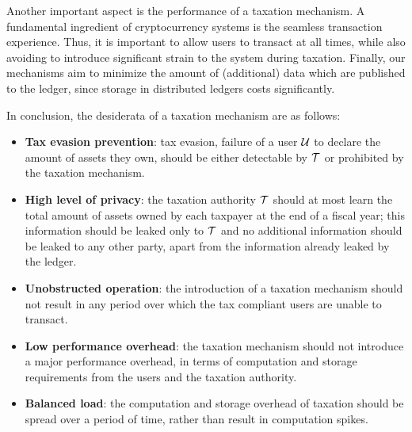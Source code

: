 Another important aspect is the performance of a taxation mechanism. A
fundamental ingredient of cryptocurrency systems is the seamless transaction
experience. Thus, it is important to allow users to transact at all times,
while also avoiding to introduce significant strain to the system during
taxation. Finally, our mechanisms aim to minimize the amount of (additional)
data which are published to the ledger, since storage in distributed ledgers
costs significantly.

In conclusion, the desiderata of a taxation mechanism are as follows:
\begin{itemize}
    \item \textbf{Tax evasion prevention}: tax evasion, \ie failure of a user
        $\mathcal{U}$ to declare the amount of assets they own, should be either
        detectable by $\mathcal{T}$ or prohibited by the taxation mechanism.
    \item \textbf{High level of privacy}: the taxation authority $\mathcal{T}$
        should at most learn the total amount of assets owned by each taxpayer
        at the end of a fiscal year; this information should be leaked only to
        $\mathcal{T}$ and no additional information should be leaked to any other
        party, apart from the information already leaked by the ledger.
    \item \textbf{Unobstructed operation}: the introduction of a taxation
        mechanism should not result in any period over which the tax compliant
        users are unable to transact.
    \item \textbf{Low performance overhead}: the taxation mechanism should not
        introduce a major performance overhead, in terms of computation and
        storage requirements from the users and the taxation authority.
    \item \textbf{Balanced load}: the computation and storage overhead of
        taxation should be spread over a period of time, rather than
        result in computation spikes.
\end{itemize}
